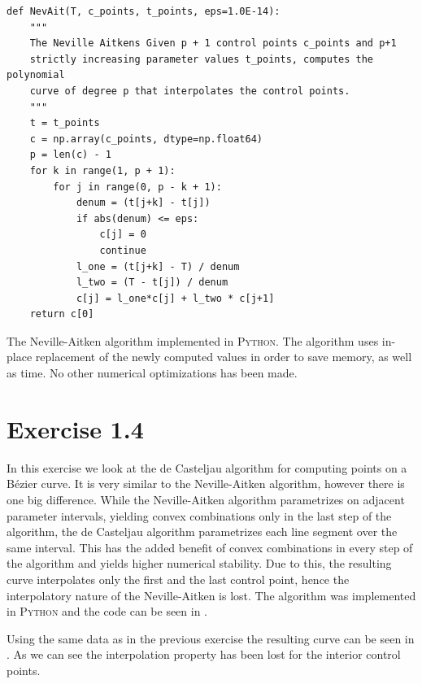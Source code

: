 \documentclass{article}
\begin{document}
    \begin{listing}
    \begin{verbatim}
def NevAit(T, c_points, t_points, eps=1.0E-14):
    """
    The Neville Aitkens Given p + 1 control points c_points and p+1
    strictly increasing parameter values t_points, computes the polynomial
    curve of degree p that interpolates the control points.
    """
    t = t_points
    c = np.array(c_points, dtype=np.float64)
    p = len(c) - 1
    for k in range(1, p + 1):
        for j in range(0, p - k + 1):
            denum = (t[j+k] - t[j]) 
            if abs(denum) <= eps:
                c[j] = 0
                continue
            l_one = (t[j+k] - T) / denum
            l_two = (T - t[j]) / denum
            c[j] = l_one*c[j] + l_two * c[j+1]
    return c[0]
    \end{verbatim}
    \caption{The Neville-Aitken algorithm implemented in \textsc{Python}. The
        algorithm uses in-place replacement of the newly computed values in
        order to save memory, as well as time. No other numerical optimizations
    has been made.}
    \label{lst:nev_ait}
    \end{listing}

    \section*{Exercise 1.4}
    \label{sec:exercise_1_4}
    
    In this exercise we look at the de Casteljau algorithm for computing points
    on a B\'ezier curve. It is very similar to the Neville-Aitken algorithm,
    however there is one big difference.  While the Neville-Aitken algorithm
    parametrizes on adjacent parameter intervals, yielding convex combinations
    only in the last step of the algorithm, the de Casteljau algorithm
    parametrizes each line segment over the same interval. This has the added
    benefit of convex combinations in every step of the algorithm and yields
    higher numerical stability. Due to this, the resulting curve interpolates
    only the first and the last control point, hence the interpolatory nature
    of the Neville-Aitken is lost. The algorithm was implemented in \textsc{Python}
    and the code can be seen in .

    Using the same data as in the previous exercise the resulting curve can be
    seen in . As we can see the interpolation property has
    been lost for the interior control points.
\end{document}
